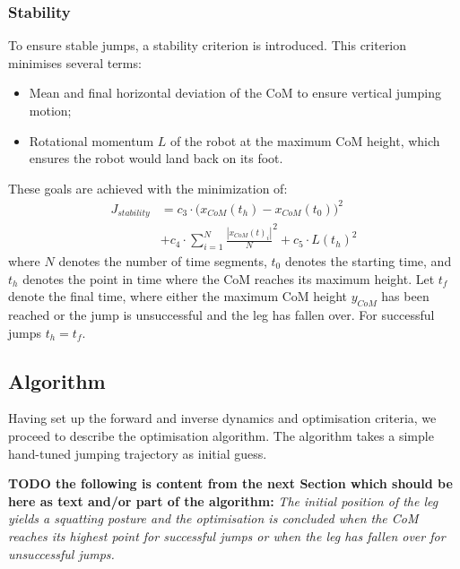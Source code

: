 \documentclass[letterpaper, 10 pt, conference]{ieeeconf}  %
\begin{document}
\subsubsection{Stability}
To ensure stable jumps, a stability criterion is introduced. This criterion minimises several terms:
\begin{itemize}
	\item Mean and final horizontal deviation of the CoM to ensure vertical jumping motion;
	\item Rotational momentum $L$ of the robot at the maximum CoM height, which ensures the robot would land back on its foot.
\end{itemize}
These goals are achieved with the minimization of:
\begin{equation}
	\begin{aligned}
		J_{stability} & =  c_3\cdot \Big( x_{CoM}(t_h)-x_{CoM}(t_0) \Big)^2  \\ & +c_4\cdot  {\sum^{N}_{i=1}\frac{| x_{CoM}(t)_i |}{N}}^2   
				  			+ c_5  \cdot   L(t_h)^2 
	\end{aligned}
\end{equation}
where $N$ denotes the number of time segments, $t_0$ denotes the starting time, and $t_h$ denotes the point in time where the CoM reaches its maximum height. Let $t_f$ denote the final time, where either the maximum CoM height $y_{CoM}$ has been reached or the jump is unsuccessful and the leg has fallen over. For successful jumps $t_h=t_f$.

\subsection{Algorithm}
\label{subsec:algorithm}
Having set up the forward and inverse dynamics and optimisation criteria, we proceed to describe the optimisation algorithm. The algorithm takes a simple hand-tuned jumping trajectory as initial guess.

\textbf{TODO the following is content from the next Section which should be here as text and/or part of the algorithm:}
\textit{The initial position of the leg yields a squatting posture and the optimisation is concluded when the CoM reaches its highest point for successful jumps or when the leg has fallen over for unsuccessful jumps.}
\end{document}
